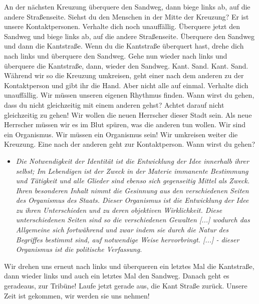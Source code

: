 \documentclass[a4paper, 12pt]{report}
\begin{document}
An der nächsten Kreuzung überquere den Sandweg, dann biege links ab, auf die andere Straßenseite.
Siehst du den Menschen in der Mitte der Kreuzung? 
Er ist unsere Kontaktpersonen.
Verhalte dich noch unauffällig.
Überquere jetzt den Sandweg und biege links ab, auf die andere Straßenseite. 
Überquere den Sandweg und dann die Kantstraße.
Wenn du die Kantstraße überquert hast, drehe dich nach links und überquere den Sandweg.
Gehe nun wieder nach links und überquere die Kantstraße, dann, wieder den Sandweg.
Kant. Sand. Kant. Sand.
Während wir so die Kreuzung umkreisen, geht einer nach dem anderen zu der Kontaktperson und gibt ihr die Hand. 
Aber nicht alle auf einmal.
Verhalte dich unauffällig.
Wir müssen unseren eigenen Rhythmus finden.
Wann wirst du gehen, dass du nicht gleichzeitig mit einem anderen gehst?
Achtet darauf nicht gleichzeitig zu gehen!
Wir wollen die neuen Herrscher dieser Stadt sein. 
Als neue Herrscher müssen wir es im Blut spüren, was die anderen tun wollen.
Wir sind ein Organismus. Wir müssen ein Organismus sein!
Wir umkreisen weiter die Kreuzung.
Eine nach der anderen geht zur Kontaktperson.
Wann wirst du gehen?
\begin{itemize}
    \item[] \textit{Die Notwendigkeit der Identität ist die Entwicklung der Idee innerhalb ihrer selbst; Im Lebendigen ist der Zweck in der Materie immanente Bestimmung und Tätigkeit und alle Glieder sind ebenso sich gegenseitig Mittel als Zweck. Ihren besonderen Inhalt nimmt die Gesinnung aus den verschiedenen Seiten des Organismus des Staats. Dieser Organismus ist die Entwicklung der Idee zu ihren Unterschieden und zu deren objektiven Wirklichkeit. Diese unterschiedenen Seiten sind so die verschiedenen Gewalten [...] wodurch das Allgemeine sich fortwährend und zwar indem sie durch die Natur des Begriffes bestimmt sind, auf notwendige Weise hervorbringt. [...] - dieser Organismus ist die politische Verfassung.}
\end{itemize}

Wir drehen uns erneut nach links und überqueren ein letztes Mal die Kantstraße, dann wieder links und auch ein letztes Mal den Sandweg. 
Danach geht es geradeaus, zur Tribüne! 
Laufe jetzt gerade aus, die Kant Straße zurück. 
Unsere Zeit ist gekommen, wir werden sie uns nehmen!\\
\end{document}
